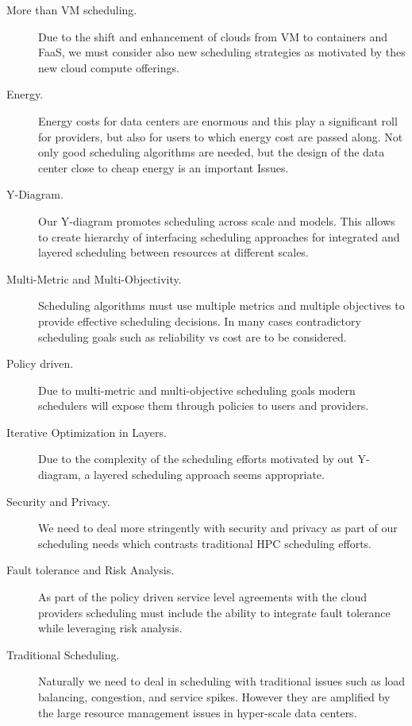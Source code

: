 \documentclass[final,5p,times,twocolumn]{elsarticle}
\begin{document}
\begin{description}

\item[More than VM scheduling.] Due to the shift and enhancement of
clouds from VM to containers and FaaS, we must consider also new
scheduling strategies as motivated by thes new cloud compute
offerings.

\item[Energy.] Energy costs for data centers are enormous and this
play a significant roll for providers, but also for users to which
energy cost are passed along. Not only good scheduling algorithms are
needed, but the design of the data center close to cheap energy is an
important Issues.

\item[Y-Diagram.] Our Y-diagram promotes scheduling across scale and
models. This allows to create hierarchy of interfacing scheduling
approaches for integrated and layered scheduling between resources at
different scales.

\item[Multi-Metric and Multi-Objectivity.] Scheduling algorithms must
use multiple metrics and multiple objectives to provide effective
scheduling decisions. In many cases contradictory scheduling goals
such as reliability vs cost are to be considered.

\item[Policy driven.] Due to multi-metric and multi-objective
scheduling goals modern schedulers will expose them through policies
to users and providers.


\item[Iterative Optimization in Layers.] Due to the complexity of the
scheduling efforts motivated by out Y-diagram, a layered scheduling
approach seems appropriate.


\item[Security and Privacy.]  We need to deal more stringently with
security and privacy as part of our scheduling needs which contrasts
traditional HPC scheduling efforts.

\item[Fault tolerance and Risk Analysis.] As part of the policy driven
service level agreements with the cloud providers scheduling must
include the ability to integrate fault tolerance while leveraging risk
analysis.

\item[Traditional Scheduling.] Naturally we need to deal in scheduling
with traditional issues such as load balancing, congestion, and
service spikes. However they are amplified by the large resource
management issues in hyper-scale data centers.



\end{description}
\end{document}
